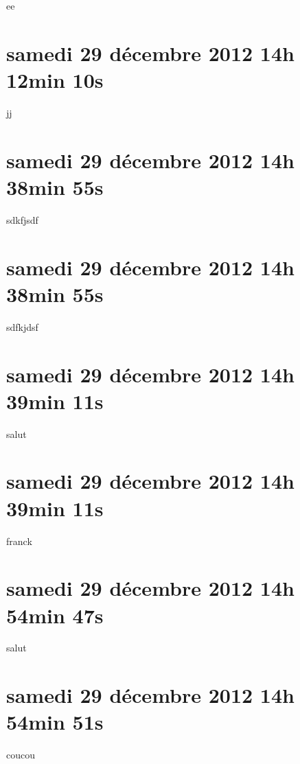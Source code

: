 ee

\section{samedi 29 décembre 2012 14h 12min 10s}

jj

\section{samedi 29 décembre 2012 14h 38min 55s}

sdkfjsdf

\section{samedi 29 décembre 2012 14h 38min 55s}

sdfkjdsf

\section{samedi 29 décembre 2012 14h 39min 11s}

salut

\section{samedi 29 décembre 2012 14h 39min 11s}

franck

\section{samedi 29 décembre 2012 14h 54min 47s}

salut

\section{samedi 29 décembre 2012 14h 54min 51s}

coucou
